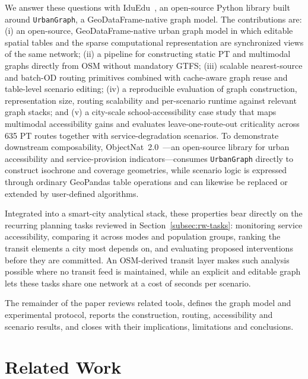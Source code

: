 \documentclass[smartcities,article,submit,moreauthors]{Definitions/mdpi}
\begin{document}
    We answer these questions with IduEdu~\cite{iduedu_docs}, an open-source Python library built
    around \texttt{UrbanGraph}, a GeoDataFrame-native graph model.
    The contributions are: (i) an open-source, GeoDataFrame-native urban graph model in which editable spatial tables
    and the sparse computational representation are synchronized views of the same network; (ii) a pipeline for
    constructing static PT and multimodal graphs directly from OSM without mandatory GTFS; (iii) scalable nearest-source
    and batch-OD routing primitives combined with cache-aware graph reuse and table-level scenario editing;
    (iv) a reproducible evaluation of graph construction, representation size, routing scalability and per-scenario
    runtime against relevant graph stacks; and (v) a city-scale school-accessibility case study that maps multimodal
    accessibility gains and evaluates leave-one-route-out criticality across 635 PT routes together with
    service-degradation scenarios.
    To demonstrate downstream composability, ObjectNat~2.0~\cite{objectnat_docs}---an open-source
    library for urban accessibility and service-provision indicators---consumes \texttt{UrbanGraph}
    directly to construct isochrone and coverage geometries, while scenario logic is expressed
    through ordinary GeoPandas table operations and can likewise be replaced or extended by user-defined algorithms.

    Integrated into a smart-city analytical stack, these properties bear directly on the recurring
    planning tasks reviewed in Section~\ref{subsec:rw-tasks}: monitoring service accessibility,
    comparing it across modes and population groups, ranking the transit elements a city most depends
    on, and evaluating proposed interventions before they are committed.
    An OSM-derived transit layer makes such analysis possible where no transit feed is maintained,
    while an explicit and editable graph lets these tasks share one network at a cost of seconds per
    scenario.

    The remainder of the paper reviews related tools, defines the graph model and experimental protocol,
    reports the construction, routing, accessibility and scenario results, and closes with their
    implications, limitations and conclusions.



    \section{Related Work}
    \label{sec:related-work}
\end{document}
